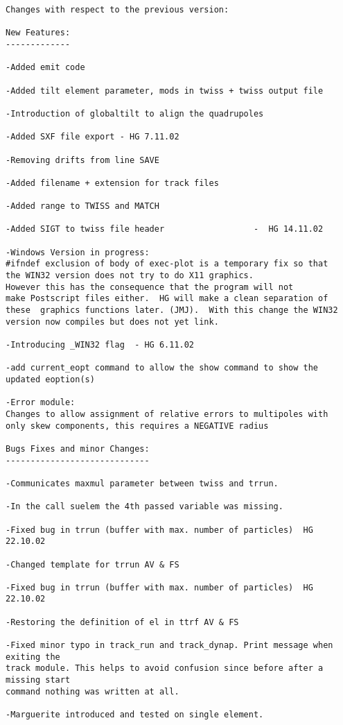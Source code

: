 \begin{verbatim}
Changes with respect to the previous version:

New Features:
-------------

-Added emit code

-Added tilt element parameter, mods in twiss + twiss output file

-Introduction of globaltilt to align the quadrupoles

-Added SXF file export - HG 7.11.02

-Removing drifts from line SAVE

-Added filename + extension for track files

-Added range to TWISS and MATCH

-Added SIGT to twiss file header                  -  HG 14.11.02

-Windows Version in progress:
#ifndef exclusion of body of exec-plot is a temporary fix so that
the WIN32 version does not try to do X11 graphics.
However this has the consequence that the program will not
make Postscript files either.  HG will make a clean separation of
these  graphics functions later. (JMJ).  With this change the WIN32
version now compiles but does not yet link.

-Introducing _WIN32 flag  - HG 6.11.02

-add current_eopt command to allow the show command to show the updated eoption(s)

-Error module:
Changes to allow assignment of relative errors to multipoles with
only skew components, this requires a NEGATIVE radius

Bugs Fixes and minor Changes:
----------------------------- 

-Communicates maxmul parameter between twiss and trrun.

-In the call suelem the 4th passed variable was missing.

-Fixed bug in trrun (buffer with max. number of particles)  HG 22.10.02

-Changed template for trrun AV & FS

-Fixed bug in trrun (buffer with max. number of particles)  HG 22.10.02

-Restoring the definition of el in ttrf AV & FS

-Fixed minor typo in track_run and track_dynap. Print message when exiting the
track module. This helps to avoid confusion since before after a missing start
command nothing was written at all.

-Marguerite introduced and tested on single element.


\end{verbatim}
